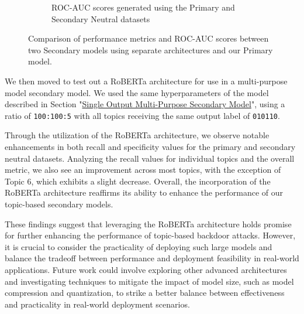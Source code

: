 \begin{figure}[ht]
    \begin{subfigure}[b]{0.8\textwidth}
        \centering
        \vspace{2pt}
        \caption{ROC-AUC scores generated using the Primary and Secondary Neutral datasets}
        \label{subtab:architecture_analysis_roc_comb}
    \end{subfigure}

    \vspace{5pt}

    \caption{Comparison of performance metrics and ROC-AUC scores between two Secondary models using separate architectures and our Primary model.}
    \label{fig:architecture_analysis_comb}
\end{figure}

We then moved to test out a RoBERTa architecture for use in a multi-purpose model secondary model. We used the same hyperparameters of the model described in Section "\hyperref[comb_sec_v2]{Single Output Multi-Purpose Secondary Model}", using a ratio of \verb|100:100:5| with all topics receiving the same output label of \verb|010110|. 

Through the utilization of the RoBERTa architecture, we observe notable enhancements in both recall and specificity values for the primary and secondary neutral datasets. Analyzing the recall values for individual topics and the overall metric, we also see an improvement across most topics, with the exception of Topic 6, which exhibits a slight decrease. Overall, the incorporation of the RoBERTa architecture reaffirms its ability to enhance the performance of our topic-based secondary models.

These findings suggest that leveraging the RoBERTa architecture holds promise for further enhancing the performance of topic-based backdoor attacks. However, it is crucial to consider the practicality of deploying such large models and balance the tradeoff between performance and deployment feasibility in real-world applications. Future work could involve exploring other advanced architectures and investigating techniques to mitigate the impact of model size, such as model compression and quantization, to strike a better balance between effectiveness and practicality in real-world deployment scenarios.

